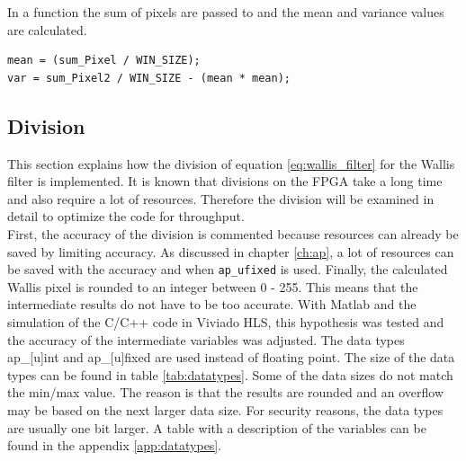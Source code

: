 In a function the sum of pixels are passed to and the mean and variance values
are calculated. \\
\begin{minipage}{\textwidth}
\begin{lstlisting}[style=CStyle, caption=Calculation of mean and variance
values, label=lst:mean_var]
mean = (sum_Pixel / WIN_SIZE);
var = sum_Pixel2 / WIN_SIZE - (mean * mean);
\end{lstlisting}
\end{minipage}


\subsection{Division} \label{ch:hls:div}
This section explains how the division of equation \ref{eq:wallis_filter} for
the Wallis filter is implemented. It is known that divisions on the FPGA take a long time and also require a lot of resources. Therefore the division will be examined in detail to optimize the code for throughput. \\
First, the accuracy of the division is commented because resources can already be
saved by limiting accuracy.
As discussed in chapter \ref{ch:ap}, a lot
of resources can be saved with the accuracy and when \texttt{ap\_ufixed} is used.
Finally, the calculated Wallis pixel is rounded to an integer between 0 - 255.
This means that the intermediate results do not have to be too accurate. With
Matlab and the simulation of the C/C++ code in Viviado HLS, this hypothesis was
tested and the accuracy of the intermediate variables was adjusted. The data types
ap\_[u]int and
ap\_[u]fixed are used instead of floating point. The size of the data types can
be
found in table \ref{tab:datatypes}. Some of the data sizes do not match the
min/max value. The reason is that the results are rounded and an overflow may be
based on the next larger data size. For security reasons, the data types are
usually one bit larger. A table with a description of the variables can be found
in the appendix \ref{app:datatypes}.

